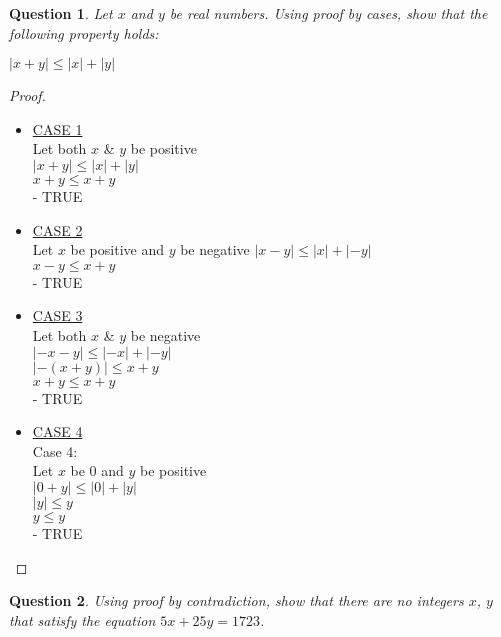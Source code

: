 \documentclass{article}
\newtheorem{question}{Question}
\begin{document}
\begin{question}
    Let $x$ and $y$ be real numbers. Using proof by cases, show that the following property holds: \\
    \centerline{$|x + y| \leq |x| + |y|$}
\end{question}
\begin{proof}
    \begin{itemize}
        \item \underline{CASE 1} \\
            Let both $x$ \& $y$ be positive \\
            $|x + y| \leq |x| + |y|$ \\
            $x + y \leq x + y$ \\
            - TRUE
        \item \underline{CASE 2}  \\
            Let $x$ be positive and $y$ be negative
            $|x - y| \leq |x| + |-y|$ \\
            $ x - y \leq x + y$ \\
            - TRUE
        \item \underline{CASE 3}  \\
            Let both $x$ \& $y$ be negative \\
            $|-x - y| \leq |-x| + |-y|$ \\
            $|-(x + y)| \leq x + y$ \\
            $x + y \leq x + y$ \\
            - TRUE
        \item \underline{CASE 4} \\
            Case 4: \\
            Let $x$ be 0 and $y$ be positive \\
            $|0 + y| \leq |0| + |y|$ \\
            $|y| \leq y$ \\
            $y \leq y$ \\
            - TRUE
    \end{itemize}
\end{proof}

\bigskip

\begin{question}
    Using proof by contradiction, show that there are no integers $x$, $y$ that satisfy the equation $5x + 25y = 1723$.
\end{question}
\end{document}
